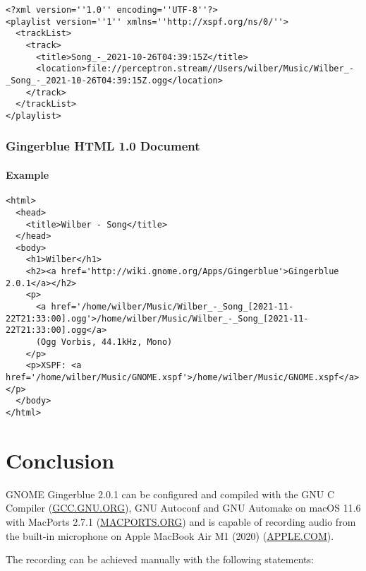 \documentclass[UKenglish]{ifimaster}  %
\begin{document}
\begin{tiny}
\begin{verbatim}
<?xml version=''1.0'' encoding=''UTF-8''?>
<playlist version=''1'' xmlns=''http://xspf.org/ns/0/''>
  <trackList>
    <track>
      <title>Song_-_2021-10-26T04:39:15Z</title>
      <location>file://perceptron.stream//Users/wilber/Music/Wilber_-_Song_-_2021-10-26T04:39:15Z.ogg</location>
    </track>
  </trackList>
</playlist>
\end{verbatim}
\end{tiny}

\section{Gingerblue HTML 1.0 Document}

\subsection{Example}

\begin{tiny}
\begin{verbatim}
<html>
  <head>
    <title>Wilber - Song</title>
  </head>
  <body>
    <h1>Wilber</h1>
    <h2><a href='http://wiki.gnome.org/Apps/Gingerblue'>Gingerblue 2.0.1</a></h2>
    <p>
      <a href='/home/wilber/Music/Wilber_-_Song_[2021-11-22T21:33:00].ogg'>/home/wilber/Music/Wilber_-_Song_[2021-11-22T21:33:00].ogg</a>
      (Ogg Vorbis, 44.1kHz, Mono)
    </p>
    <p>XSPF: <a href='/home/wilber/Music/GNOME.xspf'>/home/wilber/Music/GNOME.xspf</a></p>
  </body>
</html>
\end{verbatim}
\end{tiny}

\part{Conclusion}                     %

GNOME Gingerblue 2.0.1 can be configured and compiled with the GNU C
Compiler (\url{GCC.GNU.ORG}), GNU Autoconf and GNU Automake on macOS
11.6 with MacPorts 2.7.1 (\url{MACPORTS.ORG}) and is capable of
recording audio from the built-in microphone on Apple MacBook Air M1
(2020) (\url{APPLE.COM}).

The recording can be achieved manually with the following statements:
\end{document}
